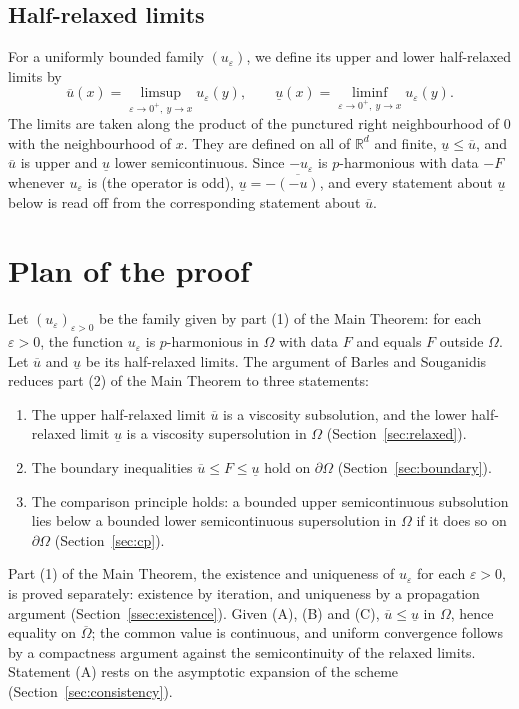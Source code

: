 \documentclass[11pt,reqno]{amsart}
\newcommand{\R}{\mathbb{R}}
\newcommand{\eps}{\varepsilon}
\theoremstyle{plain}
\theoremstyle{definition}
\theoremstyle{remark}
\begin{document}
\subsection{Half-relaxed limits}\label{ssec:relaxed}
For a uniformly bounded family $(u_\eps)$, we define its upper and lower
half-relaxed limits by
\[
  \overline u(x) = \limsup_{\eps \to 0^+,\ y \to x} u_\eps(y), \qquad
  \underline u(x) = \liminf_{\eps \to 0^+,\ y \to x} u_\eps(y).
\]
The limits are taken along the product of the punctured right neighbourhood
of $0$ with the neighbourhood of $x$. They are defined on all of $\R^d$ and
finite, $\underline u \le \overline u$, and $\overline u$ is upper and
$\underline u$ lower semicontinuous. Since $-u_\eps$ is $p$-harmonious with
data $-F$ whenever $u_\eps$ is (the operator is odd),
$\underline u = -\overline{(-u)}$, and every statement about $\underline u$
below is read off from the corresponding statement about $\overline u$.

\section{Plan of the proof}\label{sec:plan}

Let $(u_\eps)_{\eps > 0}$ be the family given by part (1) of the Main Theorem:
for each $\eps > 0$, the function $u_\eps$ is $p$-harmonious in $\Omega$ with
data $F$ and equals $F$ outside $\Omega$. Let $\overline u$ and
$\underline u$ be its half-relaxed limits. The argument of Barles and
Souganidis \cite{BS91} reduces part (2) of the Main Theorem to three statements:
\begin{enumerate}
  \item[(A)] The upper half-relaxed limit $\overline u$ is a viscosity
    subsolution, and the lower half-relaxed limit $\underline u$ is a
    viscosity supersolution in $\Omega$ (Section~\ref{sec:relaxed}).
  \item[(B)] The boundary inequalities $\overline u \le F \le \underline u$
    hold on $\partial\Omega$
    (Section~\ref{sec:boundary}).
  \item[(C)] The comparison principle holds: a bounded upper semicontinuous
    subsolution lies below a bounded lower semicontinuous supersolution in
    $\Omega$ if it does so on $\partial\Omega$ (Section~\ref{sec:cp}).
\end{enumerate}
Part (1) of the Main Theorem, the existence and uniqueness of $u_\eps$ for each
$\eps > 0$, is proved separately: existence by iteration, and uniqueness by a
propagation argument (Section~\ref{ssec:existence}). Given (A), (B) and (C),
$\overline u \le \underline u$ in $\Omega$, hence equality on
$\overline\Omega$; the common value is continuous, and uniform convergence
follows by a compactness argument against the semicontinuity of the relaxed
limits. Statement (A) rests on the asymptotic expansion of the scheme
(Section~\ref{sec:consistency}).
\end{document}
